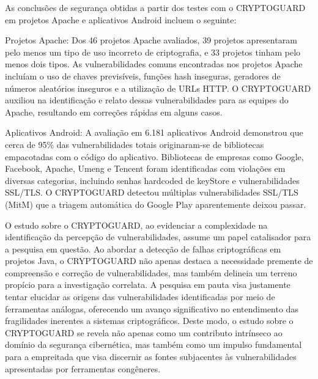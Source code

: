 

As conclusões de segurança obtidas a partir dos testes com o CRYPTOGUARD em projetos Apache e aplicativos Android incluem o seguinte:

Projetos Apache:
Dos 46 projetos Apache avaliados, 39 projetos apresentaram pelo menos um tipo de uso incorreto de criptografia, e 33 projetos tinham pelo menos dois tipos. \cite{CryptoGuard}
As vulnerabilidades comuns encontradas nos projetos Apache incluíam o uso de chaves previsíveis, funções hash inseguras, geradores de números aleatórios inseguros e a utilização de URLs HTTP. \cite{CryptoGuard}
O CRYPTOGUARD auxiliou na identificação e relato dessas vulnerabilidades para as equipes do Apache, resultando em correções rápidas em alguns casos. \cite{CryptoGuard}

Aplicativos Android:
A avaliação em 6.181 aplicativos Android demonstrou que cerca de 95\% das vulnerabilidades totais originaram-se de bibliotecas empacotadas com o código do aplicativo.\cite{CryptoGuard}
Bibliotecas de empresas como Google, Facebook, Apache, Umeng e Tencent foram identificadas com violações em diversas categorias, incluindo senhas hardcoded de keyStore e vulnerabilidades SSL/TLS.\cite{CryptoGuard}
O CRYPTOGUARD detectou múltiplas vulnerabilidades SSL/TLS (MitM) que a triagem automática do Google Play aparentemente deixou passar.\cite{CryptoGuard}



O estudo sobre o CRYPTOGUARD, ao evidenciar a complexidade na identificação da percepção de vulnerabilidades, assume um papel catalisador para a pesquisa em questão. Ao abordar a detecção de falhas criptográficas em projetos Java, o CRYPTOGUARD não apenas destaca a necessidade premente de compreensão e correção de vulnerabilidades, mas também delineia um terreno propício para a investigação correlata. A pesquisa em pauta visa justamente tentar elucidar as origens das vulnerabilidades identificadas por meio de ferramentas análogas, oferecendo um avanço significativo no entendimento das fragilidades inerentes a sistemas criptográficos. Deste modo, o estudo sobre o CRYPTOGUARD se revela não apenas como um contributo intrínseco ao domínio da segurança cibernética, mas também como um impulso fundamental para a empreitada que visa discernir as fontes subjacentes às vulnerabilidades apresentadas por ferramentas congêneres.


